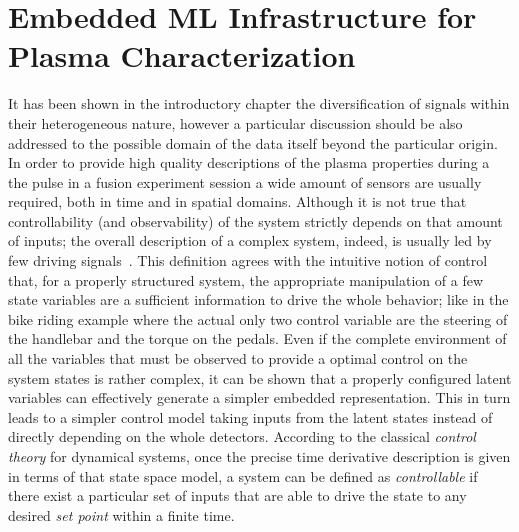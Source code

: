 
\chapter{Embedded ML Infrastructure for Plasma Characterization}

It has been shown in the introductory chapter the diversification of signals within their heterogeneous nature, however a particular discussion should be also addressed to the possible domain of the data itself beyond the particular origin.
In order to provide high quality descriptions of the plasma properties during a the pulse in a fusion experiment session a wide amount of sensors are usually required, both in time and in spatial domains.
Although it is not true that controllability (and observability) of the system strictly depends on that amount of inputs; the overall description of a complex system, indeed, is usually led by few driving signals~\cite{Liu2011}. 
This definition agrees with the intuitive notion of control that, for a properly structured system, the appropriate manipulation of a few state variables are a sufficient information to drive the whole behavior; like in the bike riding example where the actual only two control variable are the steering of the handlebar and the torque on the pedals. Even if the complete environment of all the variables that must be observed to provide a optimal control on the system states is rather complex, it can be shown that a properly configured latent variables can effectively generate a simpler embedded representation. This in turn leads to a simpler control model taking inputs from the latent states instead of directly depending on the whole detectors.
%
According to the classical \textit{control theory} for dynamical systems, once the precise time derivative description is given in terms of that state space model, a system can be defined as \textit{controllable} if there exist a particular set of inputs that are able to drive  the state to any desired \textit{set point} within a finite time. 

